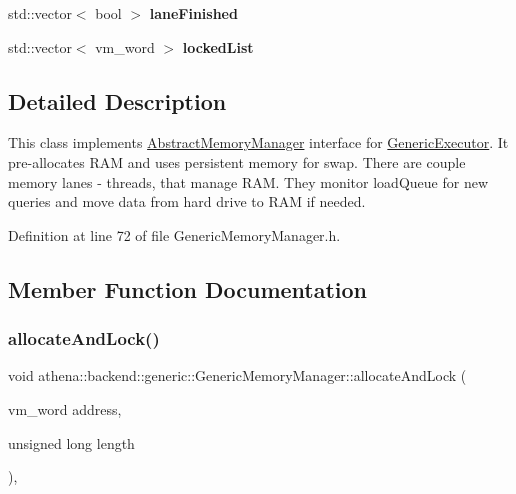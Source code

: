 \begin{DoxyCompactItemize}
\item 
\mbox{\label{classathena_1_1backend_1_1generic_1_1_generic_memory_manager_ab7487c3a37f3fa5c301d992d9e93e1f8}} 
std\+::vector$<$ bool $>$ {\bfseries lane\+Finished}
\item 
\mbox{\label{classathena_1_1backend_1_1generic_1_1_generic_memory_manager_a1f0a0595c965c01eaccb7fd255817e58}} 
std\+::vector$<$ vm\+\_\+word $>$ {\bfseries locked\+List}
\end{DoxyCompactItemize}


\subsection{Detailed Description}
This class implements \mbox{\hyperlink{classathena_1_1backend_1_1_abstract_memory_manager}{Abstract\+Memory\+Manager}} interface for \mbox{\hyperlink{classathena_1_1backend_1_1generic_1_1_generic_executor}{Generic\+Executor}}. It pre-\/allocates R\+AM and uses persistent memory for swap. There are couple memory lanes -\/ threads, that manage R\+AM. They monitor load\+Queue for new queries and move data from hard drive to R\+AM if needed. 

Definition at line 72 of file Generic\+Memory\+Manager.\+h.



\subsection{Member Function Documentation}
\mbox{\label{classathena_1_1backend_1_1generic_1_1_generic_memory_manager_abe837ac5e3bb60c9bc24836788cae679}} 
\subsubsection{\texorpdfstring{allocate\+And\+Lock()}{allocateAndLock()}\hspace{0.1cm}{\footnotesize\ttfamily [1/4]}}
{\footnotesize\ttfamily void athena\+::backend\+::generic\+::\+Generic\+Memory\+Manager\+::allocate\+And\+Lock (\begin{DoxyParamCaption}\item[{vm\+\_\+word}]{address,  }\item[{unsigned long}]{length }\end{DoxyParamCaption})\hspace{0.3cm}{\ttfamily [override]}, {\ttfamily [virtual]}}

